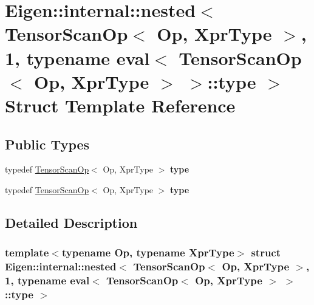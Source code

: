 \hypertarget{struct_eigen_1_1internal_1_1nested_3_01_tensor_scan_op_3_01_op_00_01_xpr_type_01_4_00_011_00_01t90fad9c409311154ad5faa69cdaa9691}{}\section{Eigen\+:\+:internal\+:\+:nested$<$ Tensor\+Scan\+Op$<$ Op, Xpr\+Type $>$, 1, typename eval$<$ Tensor\+Scan\+Op$<$ Op, Xpr\+Type $>$ $>$\+:\+:type $>$ Struct Template Reference}
\label{struct_eigen_1_1internal_1_1nested_3_01_tensor_scan_op_3_01_op_00_01_xpr_type_01_4_00_011_00_01t90fad9c409311154ad5faa69cdaa9691}
\subsection*{Public Types}
\begin{DoxyCompactItemize}
\item 
\mbox{\label{struct_eigen_1_1internal_1_1nested_3_01_tensor_scan_op_3_01_op_00_01_xpr_type_01_4_00_011_00_01t90fad9c409311154ad5faa69cdaa9691_a7a80546d3257c848232009c7244563df}} 
typedef \hyperlink{class_eigen_1_1_tensor_scan_op}{Tensor\+Scan\+Op}$<$ Op, Xpr\+Type $>$ {\bfseries type}
\item 
\mbox{\label{struct_eigen_1_1internal_1_1nested_3_01_tensor_scan_op_3_01_op_00_01_xpr_type_01_4_00_011_00_01t90fad9c409311154ad5faa69cdaa9691_a7a80546d3257c848232009c7244563df}} 
typedef \hyperlink{class_eigen_1_1_tensor_scan_op}{Tensor\+Scan\+Op}$<$ Op, Xpr\+Type $>$ {\bfseries type}
\end{DoxyCompactItemize}


\subsection{Detailed Description}
\subsubsection*{template$<$typename Op, typename Xpr\+Type$>$\newline
struct Eigen\+::internal\+::nested$<$ Tensor\+Scan\+Op$<$ Op, Xpr\+Type $>$, 1, typename eval$<$ Tensor\+Scan\+Op$<$ Op, Xpr\+Type $>$ $>$\+::type $>$}



